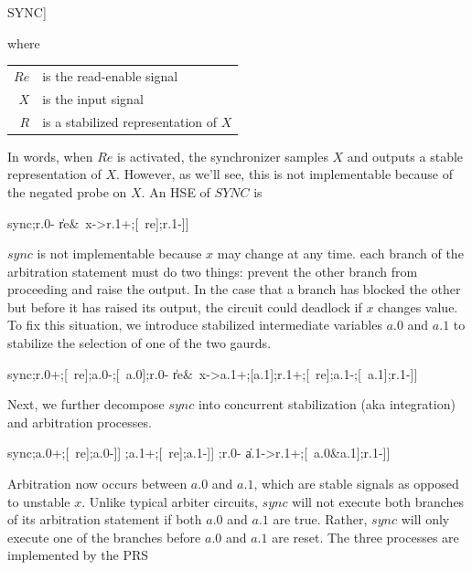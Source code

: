 \documentclass[aer.tex]{subfiles}
\begin{document}
\begin{csp}
SYNC\equiv*[[#{Re}&#X->R;Re;R
          \|#{Re}&~#X->R;Re;R]]
\end{csp}

where

\begin{tabular}[c]{rl}
$Re$ & is the read-enable signal \\
$X$ & is the input signal \\
$R$ & is a stabilized representation of $X$ \\
\end{tabular}

In words, when $Re$ is activated, the synchronizer samples $X$ and outputs a stable representation of $X$.
However, as we'll see, this is not implementable because of the negated probe on $X$. 
An HSE of $SYNC$ is

\begin{hse}
sync\equiv*[[re&x->r.0+;[~re];r.0-
        \|re&~x->r.1+;[~re];r.1-]]
\end{hse}

$sync$ is not implementable because $x$ may change at any time.
each branch of the arbitration statement must do two things:
prevent the other branch from proceeding and raise the output. In the case that a branch
has blocked the other but before it has raised its output, the circuit could deadlock if $x$ changes value.
To fix this situation, we introduce stabilized intermediate variables $a.0$ and $a.1$ to
stabilize the selection of one of the two gaurds.

\begin{hse}
sync\equiv*[[re&x->a.0+;[a.0];r.0+;[~re];a.0-;[~a.0];r.0-
        \|re&~x->a.1+;[a.1];r.1+;[~re];a.1-;[~a.1];r.1-]]
\end{hse}

Next, we further decompose $sync$ into concurrent stabilization (aka integration) and arbitration processes.

\begin{hse}
sync\equiv*[[re&~x];a.0+;[~re];a.0-]]
     \pll*[[re&x];a.1+;[~re];a.1-]]
     \pll*[[a.0->r.0+;[~a.0&~a.1];r.0-
        \|a.1->r.1+;[~a.0&a.1];r.1-]]
\end{hse}

Arbitration now occurs between $a.0$ and $a.1$, which are stable signals as opposed to unstable $x$.
Unlike typical arbiter circuits, $sync$ will not execute both branches of its arbitration statement
if both $a.0$ and $a.1$ are true. Rather, $sync$ will only execute one of the branches before 
$a.0$ and $a.1$ are reset. The three processes are implemented by the PRS
\end{document}
